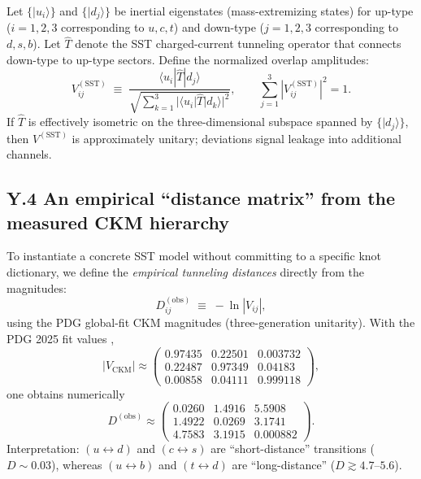 \documentclass[10pt]{article}
\begin{document}
        Let $\{|u_i\rangle\}$ and $\{|d_j\rangle\}$ be inertial eigenstates (mass-extremizing states)
        for up-type ($i=1,2,3$ corresponding to $u,c,t$) and down-type ($j=1,2,3$ corresponding to $d,s,b$).
        Let $\widehat{T}$ denote the SST charged-current tunneling operator that connects down-type to up-type sectors.
        Define the normalized overlap amplitudes:
        \begin{equation}
            V^{(\text{SST})}_{ij}
            \;\equiv\;
            \frac{\langle u_i|\widehat{T}|d_j\rangle}{\sqrt{\sum_{k=1}^3 |\langle u_i|\widehat{T}|d_k\rangle|^2}},
            \qquad
            \sum_{j=1}^3 |V^{(\text{SST})}_{ij}|^2=1.
            \label{eq:SST_CKM_def}
        \end{equation}
        If $\widehat{T}$ is effectively isometric on the three-dimensional subspace spanned by $\{|d_j\rangle\}$,
        then $V^{(\text{SST})}$ is approximately unitary; deviations signal leakage into additional channels.

    \subsection*{Y.4 An empirical ``distance matrix'' from the measured CKM hierarchy}

        To instantiate a concrete SST model without committing to a specific knot dictionary,
        we define the \emph{empirical tunneling distances} directly from the magnitudes:
        \begin{equation}
            D^{(\text{obs})}_{ij} \;\equiv\; -\ln |V_{ij}|,
            \label{eq:obs_distance_def}
        \end{equation}
        using the PDG global-fit CKM magnitudes (three-generation unitarity).
        With the PDG 2025 fit values \cite{PDG2025_CKM},
        \begin{equation}
            |V_{\text{CKM}}| \approx
            \begin{pmatrix}
                0.97435 & 0.22501 & 0.003732 \\
                0.22487 & 0.97349 & 0.04183 \\
                0.00858 & 0.04111 & 0.999118
            \end{pmatrix},
            \label{eq:PDG2025_CKM_matrix}
        \end{equation}
        one obtains numerically
        \begin{equation}
            D^{(\text{obs})} \approx
            \begin{pmatrix}
                0.0260 & 1.4916 & 5.5908 \\
                1.4922 & 0.0269 & 3.1741 \\
                4.7583 & 3.1915 & 0.000882
            \end{pmatrix}.
            \label{eq:PDG2025_distance_matrix}
        \end{equation}
        Interpretation: $(u\!\leftrightarrow\!d)$ and $(c\!\leftrightarrow\!s)$ are ``short-distance'' transitions
        ($D\sim 0.03$), whereas $(u\!\leftrightarrow\!b)$ and $(t\!\leftrightarrow\!d)$ are ``long-distance''
        ($D\gtrsim 4.7$--$5.6$).
\end{document}

